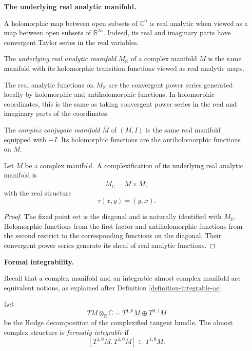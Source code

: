 \medskip\noindent
{\bf The underlying real analytic
manifold.}

A holomorphic map between open subsets of
$\mathbb{C}^n$ is real analytic when viewed
as a map between open subsets of
$\mathbb{R}^{2n}$. Indeed, its real and
imaginary parts have convergent Taylor
series in the real variables.

\begin{definition}
\label{definition-underlying-real-analytic}
The {\it underlying real analytic manifold}
$M_{\mathbb{R}}$ of a complex manifold $M$
is the same manifold with its holomorphic
transition functions viewed as real analytic
maps.
\end{definition}

The real analytic functions on
$M_{\mathbb{R}}$ are the convergent power
series generated locally by holomorphic and
antiholomorphic functions. In holomorphic
coordinates, this is the same as taking
convergent power series in the real and
imaginary parts of the coordinates.

\begin{definition}
\label{definition-conjugate-manifold}
The {\it complex conjugate manifold}
$\overline{M}$ of $(M,I)$ is the same real
manifold equipped with $-I$. Its holomorphic
functions are the antiholomorphic functions
on $M$.
\end{definition}

\begin{proposition}
\label{proposition-product-complexification}
Let $M$ be a complex manifold. A
complexification of its underlying real
analytic manifold is
$$
M_{\mathbb{C}}=M\times\overline{M},
$$
with the real structure
$$
\tau(x,y)=(y,x).
$$
\end{proposition}

\begin{proof}
The fixed point set is the diagonal and is
naturally identified with
$M_{\mathbb{R}}$. Holomorphic functions from
the first factor and antiholomorphic
functions from the second restrict to the
corresponding functions on the diagonal.
Their convergent power series generate its
sheaf of real analytic functions.
\end{proof}

\medskip\noindent
{\bf Formal integrability.}

Recall that a complex manifold and an
integrable almost complex manifold are
equivalent notions, as explained after
Definition \ref{definition-integrable-ac}.

\begin{definition}
\label{definition-formally-integrable}
Let
$$
TM\otimes_{\mathbb{R}}\mathbb{C}
=T^{1,0}M\oplus T^{0,1}M
$$
be the Hodge decomposition of the
complexified tangent bundle. The almost
complex structure is
{\it formally integrable} if
$$
[T^{1,0}M,T^{1,0}M]
\subset T^{1,0}M.
$$
\end{definition}

